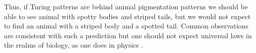  Thus, if Turing patterns are behind animal pigmentation patterns we should be able to see animal with spotty bodies and striped tails, but we would not expect to find an animal with a striped body and a spotted tail. Common observations are consistent with such a prediction  but one should not expect universal laws in the realms of biology, as one does in physics .
\begin{figure}[!!!h!!!tbp]
\centering
{}

\end{figure}
